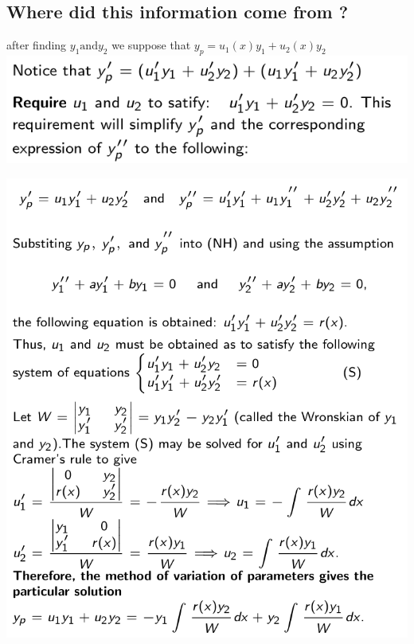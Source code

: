\documentclass[11pt]{article}
\theoremstyle{definition}
\begin{document}
\subsection{Where did this information come from ?}
after finding $y_1 \text{and} y_2$ we suppose that $y_p = u_1(x)y_1 + u_2(x)y_2$\\
\includegraphics[scale= 0.6]{images/111.png}\\
\begin{center}
    \includegraphics[scale= 0.5]{images/222.png}
\end{center}
\end{document}

